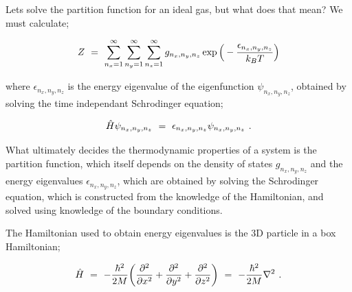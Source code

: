\documentclass{article}
\newcounter{subsubsubsection}[subsubsection]
\begin{document}


Lets solve the partition function for an ideal gas, but what does that mean? We must calculate;

\begin{equation} \label{eq:256}
Z \hspace{0.125cm} = \hspace{0.125cm} \sum_{n_x = 1}^{\infty} \sum_{n_y = 1}^{\infty} \sum_{n_z = 1}^{\infty} g_{n_x, n_y, n_z} \exp{\Big(-\frac{\epsilon_{n_x, n_y, n_z}}{k_B T} \Big)}
\end{equation}

where \begin{math} \epsilon_{n_x, n_y, n_z} \end{math} is the energy eigenvalue of the eigenfunction \begin{math} \psi_{n_x, n_y, n_z} \end{math}, obtained by solving the time independant Schrodinger equation;

\begin{equation} \label{eq:256}
\hat{H} \psi_{n_x, n_y, n_z} \hspace{0.125cm} = \hspace{0.125cm} \epsilon_{n_x, n_y, n_z} \psi_{n_x, n_y, n_z} \hspace{0.125cm} .
\end{equation}

What ultimately decides the thermodynamic properties of a system is the partition function, which itself depends on the density of states \begin{math} g_{n_x, n_y, n_z} \end{math} and the energy eigenvalues \begin{math} \epsilon_{n_x, n_y, n_z} \end{math}, which are obtained by solving the Schrodinger equation, which is constructed from the knowledge of the Hamiltonian, and solved using knowledge of the boundary conditions. 

The Hamiltonian used to obtain energy eigenvalues is the 3D particle in a box Hamiltonian;

\begin{equation} \label{eq:256}
\hat{H} \hspace{0.125cm} = \hspace{0.125cm} - \frac{\hbar^2}{2 M} \bigg( \frac{\partial^2}{\partial{x^2}} + \frac{\partial^2}{\partial{y^2}} + \frac{\partial^2}{\partial{z^2}} \bigg) \hspace{0.125cm} = \hspace{0.125cm} - \frac{\hbar^2}{2 M} \nabla^2 \hspace{0.125cm} .
\end{equation}
\end{document}
